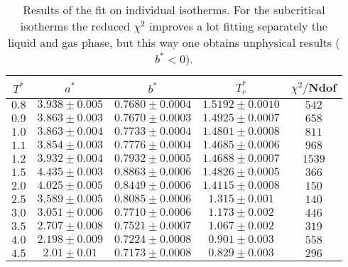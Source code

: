 \documentclass[a4paper, 11pt]{article}
\begin{document}
    \begin{table}
      \centering
      \begin{tabular}{ccccc}
          \toprule
          $T^*$ & $a^*$ & $b^*$ & $T_c^*$ & $\chi^2/$Ndof \\
          \midrule
          $0.8$ & $3.938 \pm 0.005$ & $0.7680 \pm 0.0004$ & $1.5192 \pm 0.0010$ & $542$ \\
          $0.9$ & $3.863 \pm 0.003$ & $0.7670 \pm 0.0003$ & $1.4925 \pm 0.0007$ & $658$ \\
          $1.0$ & $3.863 \pm 0.004$ & $0.7733 \pm 0.0004$ & $1.4801 \pm 0.0008$ & $811$ \\
          $1.1$ & $3.854 \pm 0.003$ & $0.7776 \pm 0.0004$ & $1.4685 \pm 0.0006$ & $968$ \\
          $1.2$ & $3.932 \pm 0.004$ & $0.7932 \pm 0.0005$ & $1.4688 \pm 0.0007$ & $1539$ \\
          \midrule
          $1.5$ & $4.435 \pm 0.003$ & $0.8863 \pm 0.0006$ & $1.4826 \pm 0.0005$ & $366$ \\
          $2.0$ & $4.025 \pm 0.005$ & $0.8449 \pm 0.0006$ & $1.4115 \pm 0.0008$ & $150$ \\
          $2.5$ & $3.589 \pm 0.005$ & $0.8085 \pm 0.0006$ & $1.315 \pm 0.001$ & $140$ \\
          $3.0$ & $3.051 \pm 0.006$ & $0.7710 \pm 0.0006$ & $1.173 \pm 0.002$ & $446$ \\
          $3.5$ & $2.707 \pm 0.008$ & $0.7521 \pm 0.0007$ & $1.067 \pm 0.002$ & $319$ \\
          $4.0$ & $2.198 \pm 0.009$ & $0.7224 \pm 0.0008$ & $0.901 \pm 0.003$ & $558$ \\
          $4.5$ & $2.01 \pm 0.01$ & $0.7173 \pm 0.0008$ & $0.829 \pm 0.003$ & $296$ \\
          \bottomrule
        \end{tabular}
      \caption{Results of the fit on individual isotherms. For the subcritical isotherms the reduced $\chi^2$ improves a lot fitting separately the liquid and gas phase, but this way one obtains unphysical results ($b^* < 0$).}
      \label{tab:isotherm_params}
    \end{table}



\end{document}
